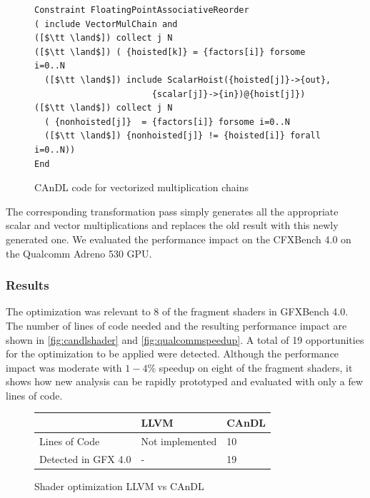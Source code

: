 \begin{figure}[ht]
\begin{lstlisting}[language=CAnDL]
Constraint FloatingPointAssociativeReorder
( include VectorMulChain and
([$\tt \land$]) collect j N
([$\tt \land$]) ( {hoisted[k]} = {factors[i]} forsome i=0..N
  ([$\tt \land$]) include ScalarHoist({hoisted[j]}->{out},
                       {scalar[j]}->{in})@{hoist[j]})
([$\tt \land$]) collect j N
  ( {nonhoisted[j]}  = {factors[i]} forsome i=0..N
  ([$\tt \land$]) {nonhoisted[j]} != {hoisted[i]} forall  i=0..N))
End
\end{lstlisting}
\vspace{-0.3cm}
\caption{CAnDL code for vectorized multiplication chains}
\label{fig:Lewis}
\end{figure}

    The corresponding transformation pass simply generates all the appropriate
    scalar and vector multiplications and replaces the old result with this
    newly generated one.
    We evaluated the performance impact on the CFXBench 4.0 on the  Qualcomm
    Adreno 530 GPU.

\subsubsection{Results}
    The optimization was relevant to 8 of the fragment shaders in GFXBench 4.0.
    The number of lines of code needed and the resulting performance impact are
    shown in \autoref{fig:candlshader} and \autoref{fig:qualcommspeedup}.
    A total of 19 opportunities for the optimization to be applied were
    detected.
    Although the performance impact was moderate with $1-4\%$ speedup on eight
    of the fragment shaders, it shows how new analysis can be rapidly prototyped
    and evaluated with only a few lines of code.

\begin{figure}[ht]
\centering
\begin{tabular}{|l||l|l|}
\hline
         & LLVM  &CAnDL \\
\hline
\hline
Lines of Code & Not implemented& 10 \\ \hline
Detected in GFX 4.0 & - & 19 \\ \hline
\hline
\end{tabular}
\caption{Shader optimization LLVM vs CAnDL}
\label{fig:candlshader}
\end{figure}

